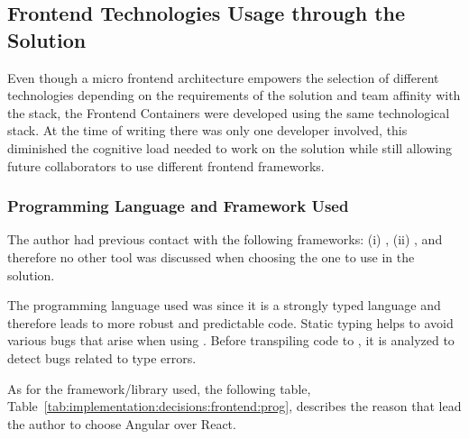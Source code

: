 \subsection{Frontend Technologies Usage through the Solution}
\label{subsec:implementation:decisions:frontend}

Even though a micro frontend architecture empowers the selection of different technologies depending on the requirements of the solution and team affinity with the stack, the Frontend Containers were developed using the same technological stack. At the time of writing there was only one developer involved, this diminished the cognitive load needed to work on the solution while still allowing future collaborators to use different frontend frameworks.

\subsubsection{Programming Language and Framework Used}
\label{subsubsec:implementation:decisions:frontend:prog}

The author had previous contact with the following frameworks: (i) , (ii) , and therefore no other tool was discussed when choosing the one to use in the solution.

The programming language used was  since it is a strongly typed language and therefore leads to more robust and predictable code. Static typing helps to avoid various bugs that arise when using . Before transpiling  code to , it is analyzed to detect bugs related to type errors.

As for the framework/library used, the following table, Table~\ref{tab:implementation:decisions:frontend:prog}, describes the reason that lead the author to choose Angular over React.

